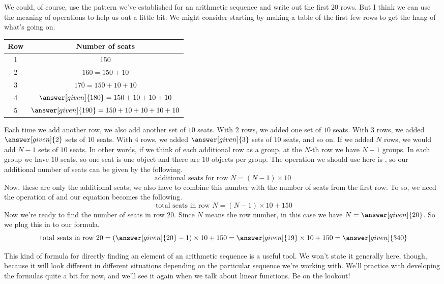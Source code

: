 \documentclass{ximera}
\begin{document}
\begin{example}
We could, of course, use the pattern we've established for an arithmetic sequence and write out the first $20$ rows. But I think we can use the meaning of operations to help us out a little bit. We might consider starting by making a table of the first few rows to get the hang of what's going on.
\begin{image}
\begin{tabular}{c|c}
Row & Number of seats \\ \hline
1 & 150 \\ \hline
2 & $160 = 150 + 10$ \\ \hline
3 & $170 = 150 + 10 + 10$ \\ \hline
4 & $\answer[given]{180} = 150 + 10 + 10 + 10$ \\ \hline
5 & $\answer[given]{190} = 150 + 10 + 10 + 10 + 10$ \\ \hline
\end{tabular}
\end{image}
Each time we add another row, we also add another set of $10$ seats. With $2$ rows, we added one set of $10$ seats. With $3$ rows, we added $\answer[given]{2}$ sets of $10$ seats. With $4$ rows, we added $\answer[given]{3}$ sets of $10$ seats, and so on. If we added $N$ rows, we would add $N-1$ sets of $10$ seats. In other words, if we think of each additional row as a group, at the $N$-th row we have $N-1$ groups. In each group we have $10$ seats, so one seat is one object and there are $10$ objects per group. The operation we should use here is   , so our additional number of seats can be given by the following.
\[
\textrm{additional seats for row }N = (N-1)\times 10
\]
Now, these are only the additional seats; we also have to combine this number with the number of seats from the first row. To so, we need the operation of  and our equation becomes the following.
\[
\textrm{ total seats in row }N = (N-1) \times 10 + 150
\]
Now we're ready to find the number of seats in row $20$. Since $N$ means the row number, in this case we have $N=\answer[given]{20}$. So we plug this in to our formula.
\[
\textrm{ total seats in row } 20 = \left (\answer[given]{20} - 1 \right ) \times 10 + 150 = \answer[given]{19} \times 10 + 150 = \answer[given]{340}
\]

\end{example}
This kind of formula for directly finding an element of an arithmetic sequence is a useful tool. We won't state it generally here, though, because it will look different in different situations depending on the particular sequence we're working with. We'll practice with developing the formulas quite a bit for now, and we'll see it again when we talk about linear functions. Be on the lookout!
\end{document}
